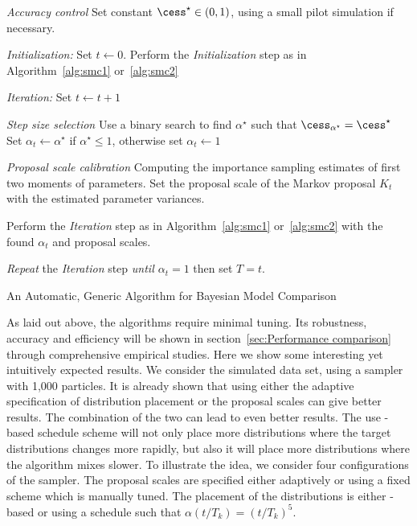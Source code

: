 \begin{algorithm}
\begin{algorithmic}
  \tophrule
  \STATE \emph{Accuracy control}
  \STATE\STATESKIP Set constant $\cess^\star\in(0,1)$, using a small pilot
  simulation if necessary.

  \STATE \emph{Initialization:} Set $t\leftarrow0$.
  \STATE\STATESKIP Perform the \emph{Initialization} step
    as in Algorithm~\ref{alg:smc1} or~\ref{alg:smc2}

  \STATE \emph{Iteration:} Set $t\leftarrow t + 1$

  \STATE\STATESKIP \emph{Step size selection}
  \STATE\STATESKIP\STATESKIP Use a binary search %
  to find $\alpha^\star$ such that $\cess_{\alpha^\star} = \cess^\star$
  \STATE\STATESKIP\STATESKIP Set $\alpha_t \leftarrow\alpha^\star$ if
    $\alpha^\star \le 1$, otherwise set $\alpha_t\leftarrow1$

  \STATE\STATESKIP \emph{Proposal scale calibration}
  \STATE\STATESKIP\STATESKIP
  Computing the importance sampling estimates of first two moments of
  parameters.
  \STATE\STATESKIP\STATESKIP
  Set the proposal scale of the Markov proposal $K_t$ with the estimated
  parameter variances.

  \STATE\STATESKIP Perform the \emph{Iteration} step as in
  Algorithm~\ref{alg:smc1} or~\ref{alg:smc2} with the found $\alpha_t$
  and proposal scales.

  \STATE \emph{Repeat} the \emph{Iteration} step %
    \emph{until $\alpha_t = 1$} then set $T=t$.
  \bottomhrule
\end{algorithmic}
\caption{An Automatic, Generic Algorithm for Bayesian Model Comparison}
\label{alg:adaptive}
\end{algorithm}

As laid out above, the algorithms require minimal tuning. Its robustness,
accuracy and efficiency will be shown in section~\ref{sec:Performance
  comparison} through comprehensive empirical studies. Here we show some
interesting yet intuitively expected results. We consider the simulated \pet
data set, using a \smc[2] sampler with 1,000 particles. It is already shown
that using either the adaptive specification of distribution placement or the
\mcmc proposal scales can give better results. The combination of the two can
lead to even better results. The use \cess-based schedule scheme will not only
place more distributions where the target distributions changes more rapidly,
but also it will place more distributions where the \mcmc algorithm mixes
slower. To illustrate the idea, we consider four configurations of the
sampler. The proposal scales are specified either adaptively or using a fixed
scheme which is manually tuned. The placement of the distributions is either
\cess-based or using a schedule such that $\alpha(t/T_k) = (t/T_k)^5$.

